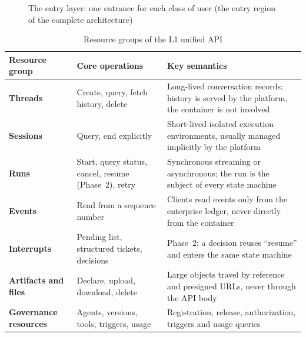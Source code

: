 \begin{figure}[htbp]
\centering
{}
\caption[The entry layer]{The entry layer: one entrance for each class of user (the entry region of the complete architecture)}
\label{fig:zoom-entry}
\end{figure}

\begin{table}[htbp]
\centering
\caption{Resource groups of the L1 unified API}
\label{tab:l1}
\begin{tabularx}{\textwidth}{@{}>{\bfseries}L{3.0cm}L{4.8cm}Y@{}}
  \toprule
  \textbf{Resource group} & \textbf{Core operations} & \textbf{Key semantics}\\
  \midrule
  Threads & Create, query, fetch history, delete & Long-lived conversation records; history is served by the platform, the container is not involved\\
  Sessions & Query, end explicitly & Short-lived isolated execution environments, usually managed implicitly by the platform\\
  Runs & Start, query status, cancel, resume (Phase~2), retry & Synchronous streaming or asynchronous; the run is the subject of every state machine\\
  Events & Read from a sequence number & Clients read events only from the enterprise ledger, never directly from the container\\
  Interrupts & Pending list, structured tickets, decisions & Phase~2; a decision reuses ``resume'' and enters the same state machine\\
  Artifacts and files & Declare, upload, download, delete & Large objects travel by reference and presigned URLs, never through the API body\\
  Governance resources & Agents, versions, tools, triggers, usage & Registration, release, authorization, triggers and usage queries\\
  \bottomrule
\end{tabularx}
\end{table}

